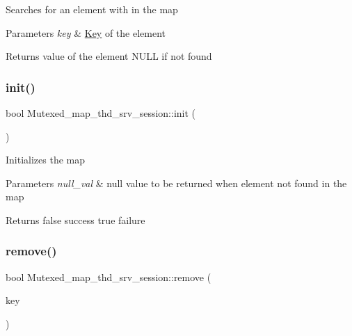 Searches for an element with in the map


\begin{DoxyParams}{Parameters}
{\em key} & \mbox{\hyperlink{classKey}{Key}} of the element\\
\hline
\end{DoxyParams}
\begin{DoxyReturn}{Returns}
value of the element N\+U\+LL if not found 
\end{DoxyReturn}
\mbox{\label{classMutexed__map__thd__srv__session_a6f50806bddeeb218cd03c27cba2f58a4}} 
\subsubsection{\texorpdfstring{init()}{init()}}
{\footnotesize\ttfamily bool Mutexed\+\_\+map\+\_\+thd\+\_\+srv\+\_\+session\+::init (\begin{DoxyParamCaption}\item[{void}]{ }\end{DoxyParamCaption})\hspace{0.3cm}{\ttfamily [inline]}}

Initializes the map


\begin{DoxyParams}{Parameters}
{\em null\+\_\+val} & null value to be returned when element not found in the map\\
\hline
\end{DoxyParams}
\begin{DoxyReturn}{Returns}
false success true failure 
\end{DoxyReturn}
\mbox{\label{classMutexed__map__thd__srv__session_aeb691ab25dc82da3a4a778ac202ae21b}} 
\subsubsection{\texorpdfstring{remove()}{remove()}}
{\footnotesize\ttfamily bool Mutexed\+\_\+map\+\_\+thd\+\_\+srv\+\_\+session\+::remove (\begin{DoxyParamCaption}\item[{const T\+HD $\ast$}]{key }\end{DoxyParamCaption})\hspace{0.3cm}{\ttfamily [inline]}}

